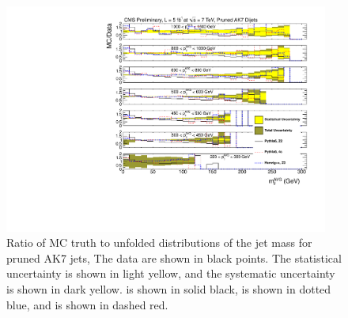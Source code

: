 \begin{figure}[htbp]
\centering
\includegraphics[width=0.95\textwidth]{figs/unfoldedMeasurementDijets_allfrac__Pruned}
\caption{Ratio of MC truth to unfolded distributions of the jet mass for pruned AK7 jets,
The data are shown in black points.
The statistical uncertainty is shown in light yellow, and the
systematic uncertainty is shown in dark yellow. \PYTHIA is shown in solid black, \HERWIG is shown in dotted blue, and  is shown in dashed red.
\label{figs:unfoldedMeasurementDijets_allfrac_Pruned}}
\end{figure}









%
